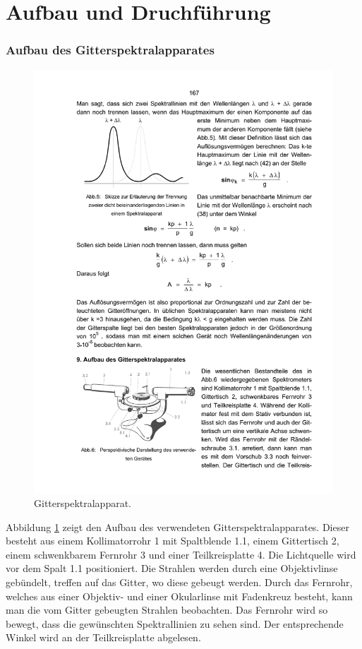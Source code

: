 \section{Aufbau und Druchführung}
\label{sec:durchfuehrung}

\subsubsection{Aufbau des Gitterspektralapparates}

\begin{figure}
  \centering
  \includegraphics[scale=0.8]{content/aufbau1.pdf}
\caption{Gitterspektralapparat\cite{anleitung605}.}
  \label{fig:spektralap}
\end{figure}
Abbildung \ref{fig:spektralap} zeigt den Aufbau des verwendeten Gitterspektralapparates. Dieser besteht aus einem Kollimatorrohr 1 mit Spaltblende 1.1, einem Gittertisch 2, einem schwenkbarem Fernrohr 3 und einer Teilkreisplatte 4. Die Lichtquelle wird vor dem Spalt 1.1 positioniert. Die Strahlen werden durch eine Objektivlinse gebündelt, treffen auf das Gitter, wo diese gebeugt werden. Durch das Fernrohr, welches aus einer Objektiv- und einer Okularlinse mit Fadenkreuz besteht, kann man die vom Gitter gebeugten Strahlen beobachten. Das Fernrohr wird so bewegt, dass die gewünschten Spektrallinien zu sehen sind. Der entsprechende Winkel wird an der Teilkreisplatte abgelesen.

